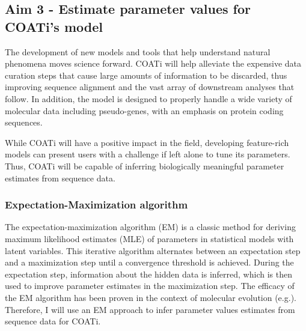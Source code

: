 \subsection{Aim 3 - Estimate parameter values for COATi's model}



The development of new models and tools that help understand natural phenomena
moves science forward.
COATi will help alleviate the expensive data curation steps that cause large
amounts of information to be discarded, thus improving sequence alignment and
the vast array of downstream analyses that follow.
In addition, the model is designed to properly handle a wide variety of
molecular data including pseudo-genes, with an emphasis on protein coding
sequences.

While COATi will have a positive impact in the field, developing feature-rich
models can present users with a challenge if left alone to tune its parameters.
Thus, COATi will be capable of inferring biologically meaningful parameter
estimates from sequence data.

\subsubsection{Expectation-Maximization algorithm}
The expectation-maximization algorithm (EM)
\parencite{dempster_laird_rubin_EM_1977} is a classic method for deriving
maximum likelihood estimates (MLE) of parameters in statistical models with
latent variables.
This iterative algorithm alternates between an expectation step and a
maximization step until a convergence threshold is achieved.
During the expectation step, information about the hidden data is inferred,
which is then used to improve parameter estimates in the maximization step.
The efficacy of the EM algorithm has been proven in the context of molecular
evolution (e.g.\cite{holmes2002expectation,holmes_em_2005}).
Therefore, I will use an EM approach to infer parameter values estimates from
sequence data for COATi.

